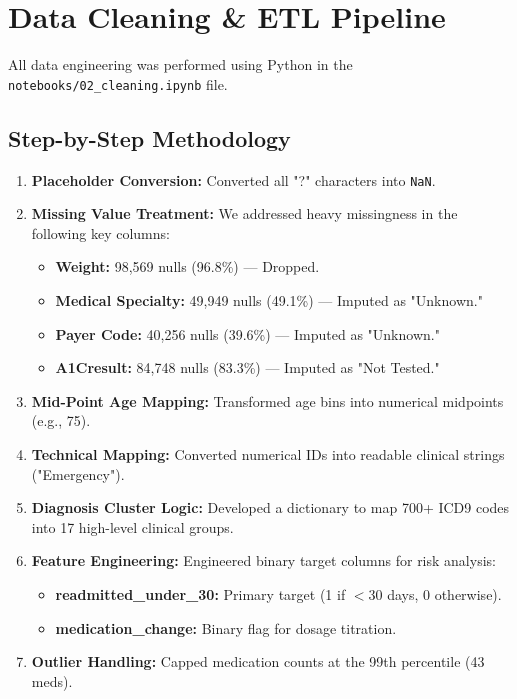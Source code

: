 \documentclass[12pt,a4paper]{article}
\begin{document}
\section{Data Cleaning \& ETL Pipeline}
All data engineering was performed using Python in the \texttt{notebooks/02\_cleaning.ipynb} file.

\subsection{Step-by-Step Methodology}
\begin{enumerate}
    \item \textbf{Placeholder Conversion:} Converted all "?" characters into \texttt{NaN}.
    \item \textbf{Missing Value Treatment:} We addressed heavy missingness in the following key columns:
    \begin{itemize}
        \item \textbf{Weight:} 98,569 nulls (96.8\%) — Dropped.
        \item \textbf{Medical Specialty:} 49,949 nulls (49.1\%) — Imputed as "Unknown."
        \item \textbf{Payer Code:} 40,256 nulls (39.6\%) — Imputed as "Unknown."
        \item \textbf{A1Cresult:} 84,748 nulls (83.3\%) — Imputed as "Not Tested."
    \end{itemize}
    \item \textbf{Mid-Point Age Mapping:} Transformed age bins into numerical midpoints (e.g., 75).
    \item \textbf{Technical Mapping:} Converted numerical IDs into readable clinical strings ("Emergency").
    \item \textbf{Diagnosis Cluster Logic:} Developed a dictionary to map 700+ ICD9 codes into 17 high-level clinical groups.
    \item \textbf{Feature Engineering:} Engineered binary target columns for risk analysis:
    \begin{itemize}
        \item \textbf{readmitted\_under\_30:} Primary target (1 if $<30$ days, 0 otherwise).
        \item \textbf{medication\_change:} Binary flag for dosage titration.
    \end{itemize}
    \item \textbf{Outlier Handling:} Capped medication counts at the 99th percentile (43 meds).
\end{enumerate}
\end{document}
